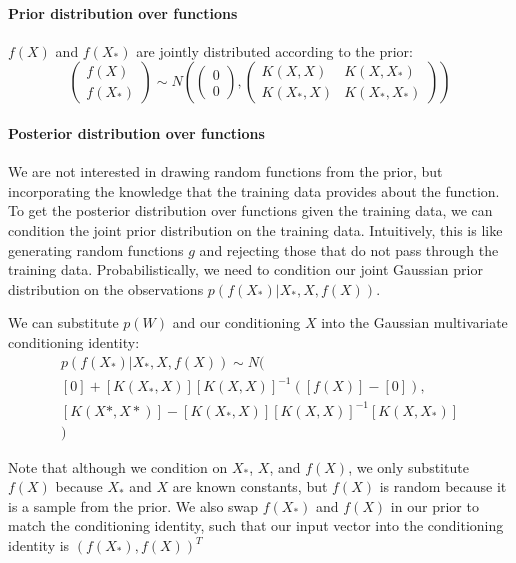 \documentclass[10pt]{article}
\begin{document}
\paragraph{Prior distribution over functions}
$f(X)$ and $f(X_*)$ are jointly distributed according to the prior:
\begin{equation*}
    \begin{pmatrix}
        f(X) \\ f(X_*)
    \end{pmatrix} \sim N\left(
    \begin{pmatrix}
        0 \\ 0
    \end{pmatrix},
    \begin{pmatrix}
        K(X,X) & K(X,X_*) \\ K(X_*,X) & K(X_*,X_*)
    \end{pmatrix}
    \right)
\end{equation*}

\paragraph{Posterior distribution over functions}
We are not interested in drawing random functions from the prior, but incorporating the knowledge that the training data provides about the function. To get the posterior distribution over functions given the training data, we can condition the joint prior distribution on the training data. Intuitively, this is like generating random functions $g$ and rejecting those that do not pass through the training data. Probabilistically, we need to condition our joint Gaussian prior distribution on the observations $p(f(X_*)|X_*, X, f(X))$.

We can substitute $p(W)$ and our conditioning $X$ into the Gaussian multivariate conditioning identity:
\begin{equation*}
    \begin{aligned}
        p(f(X_*)|X_*, X, f(X)) \sim N( \\
        [0] + [K(X_*,X)][K(X,X)]^{-1}([f(X)] - [0]), \\
        [K(X*,X*)] - [K(X_*,X)][K(X,X)]^{-1}[K(X,X_*)] \\
        )
    \end{aligned}
\end{equation*}

Note that although we condition on $X_*$, $X$, and $f(X)$, we only substitute $f(X)$ because $X_*$ and $X$ are known constants, but $f(X)$ is random because it is a sample from the prior. We also swap $f(X_*)$ and $f(X)$ in our prior to match the conditioning identity, such that our input vector into the conditioning identity is $(f(X_*), f(X))^T$
    
\end{document}
